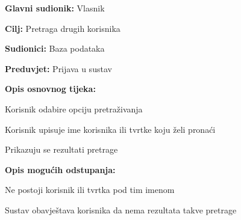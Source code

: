 				\noindent {}
				\begin{packed_item}
					
					\item \textbf{Glavni sudionik: } Vlasnik  
					\item  \textbf{Cilj:} Pretraga drugih korisnika
					\item  \textbf{Sudionici:} Baza podataka
					\item  \textbf{Preduvjet:} Prijava u sustav
					\item  \textbf{Opis osnovnog tijeka:}
					
					\item[] \begin{packed_enum}
						
						\item Korisnik odabire opciju pretraživanja
						\item Korisnik upisuje ime korisnika ili tvrtke koju želi pronaći
						\item Prikazuju se rezultati pretrage
					\end{packed_enum}
					
					\item  \textbf{Opis mogućih odstupanja:}
					
					\item[] \begin{packed_item}
						
						\item[2.a] Ne postoji korisnik ili tvrtka pod tim imenom
						\item[] \begin{packed_enum}
							
							\item Sustav obavještava korisnika da nema rezultata takve pretrage
							
						\end{packed_enum}
						
					\end{packed_item}
				\end{packed_item}	
				
